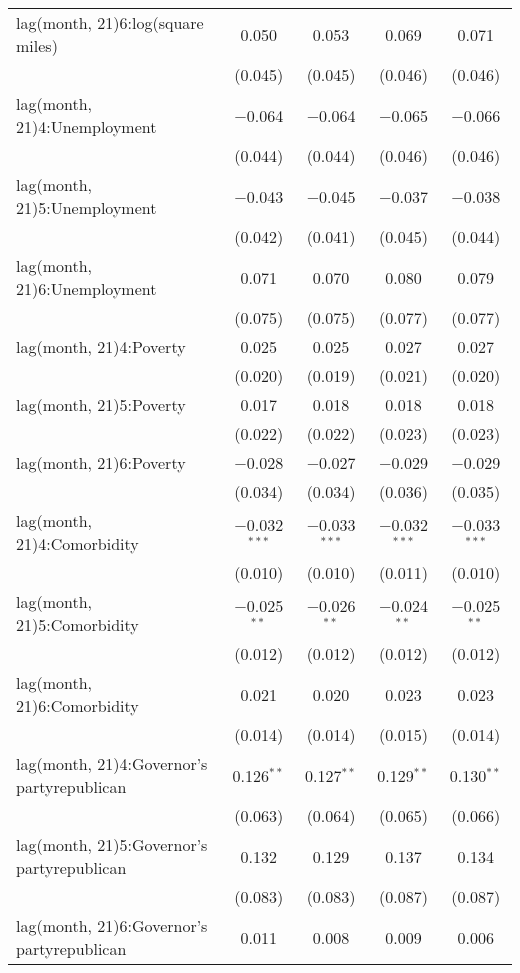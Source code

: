 \begin{tabular}{@{\extracolsep{1pt}}lcccc}
  lag(month, 21)6:log(square miles) & 0.050 & 0.053 & 0.069 & 0.071 \\ 
  & (0.045) & (0.045) & (0.046) & (0.046) \\ 
  lag(month, 21)4:Unemployment & $-$0.064 & $-$0.064 & $-$0.065 & $-$0.066 \\ 
  & (0.044) & (0.044) & (0.046) & (0.046) \\ 
  lag(month, 21)5:Unemployment & $-$0.043 & $-$0.045 & $-$0.037 & $-$0.038 \\ 
  & (0.042) & (0.041) & (0.045) & (0.044) \\ 
  lag(month, 21)6:Unemployment & 0.071 & 0.070 & 0.080 & 0.079 \\ 
  & (0.075) & (0.075) & (0.077) & (0.077) \\ 
  lag(month, 21)4:Poverty & 0.025 & 0.025 & 0.027 & 0.027 \\ 
  & (0.020) & (0.019) & (0.021) & (0.020) \\ 
  lag(month, 21)5:Poverty & 0.017 & 0.018 & 0.018 & 0.018 \\ 
  & (0.022) & (0.022) & (0.023) & (0.023) \\ 
  lag(month, 21)6:Poverty & $-$0.028 & $-$0.027 & $-$0.029 & $-$0.029 \\ 
  & (0.034) & (0.034) & (0.036) & (0.035) \\ 
  lag(month, 21)4:Comorbidity & $-$0.032$^{***}$ & $-$0.033$^{***}$ & $-$0.032$^{***}$ & $-$0.033$^{***}$ \\ 
  & (0.010) & (0.010) & (0.011) & (0.010) \\ 
  lag(month, 21)5:Comorbidity & $-$0.025$^{**}$ & $-$0.026$^{**}$ & $-$0.024$^{**}$ & $-$0.025$^{**}$ \\ 
  & (0.012) & (0.012) & (0.012) & (0.012) \\ 
  lag(month, 21)6:Comorbidity & 0.021 & 0.020 & 0.023 & 0.023 \\ 
  & (0.014) & (0.014) & (0.015) & (0.014) \\ 
  lag(month, 21)4:Governor's partyrepublican & 0.126$^{**}$ & 0.127$^{**}$ & 0.129$^{**}$ & 0.130$^{**}$ \\ 
  & (0.063) & (0.064) & (0.065) & (0.066) \\ 
  lag(month, 21)5:Governor's partyrepublican & 0.132 & 0.129 & 0.137 & 0.134 \\ 
  & (0.083) & (0.083) & (0.087) & (0.087) \\ 
  lag(month, 21)6:Governor's partyrepublican & 0.011 & 0.008 & 0.009 & 0.006 \\ 

\end{tabular}
